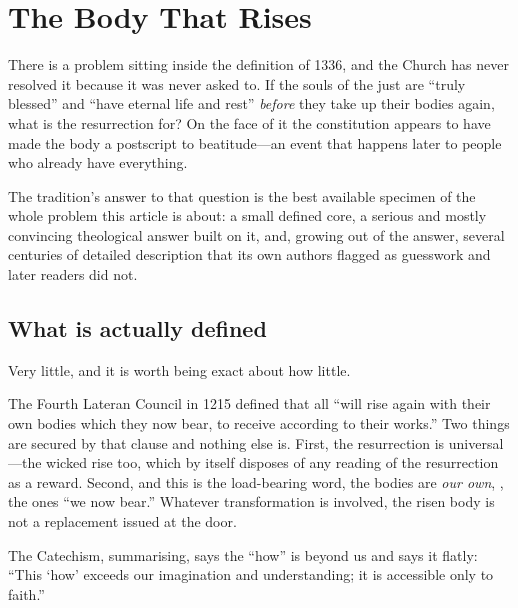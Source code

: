 \section{The Body That Rises}

There is a problem sitting inside the definition of 1336, and the Church has never resolved it because it was never asked to. If the souls of the just are ``truly blessed'' and ``have eternal life and rest'' \emph{before} they take up their bodies again, what is the resurrection for? On the face of it the constitution appears to have made the body a postscript to beatitude---an event that happens later to people who already have everything.

The tradition's answer to that question is the best available specimen of the whole problem this article is about: a small defined core, a serious and mostly convincing theological answer built on it, and, growing out of the answer, several centuries of detailed description that its own authors flagged as guesswork and later readers did not.

\subsection{What is actually defined}

Very little, and it is worth being exact about how little.

The Fourth Lateran Council in 1215 defined that all ``will rise again with their own bodies which they now bear, to receive according to their works.'' Two things are secured by that clause and nothing else is. First, the resurrection is universal---the wicked rise too, which by itself disposes of any reading of the resurrection as a reward. Second, and this is the load-bearing word, the bodies are \emph{our own}, , the ones ``we now bear.'' Whatever transformation is involved, the risen body is not a replacement issued at the door.

The Catechism, summarising, says the ``how'' is beyond us and says it flatly: ``This `how' exceeds our imagination and understanding; it is accessible only to faith.''

